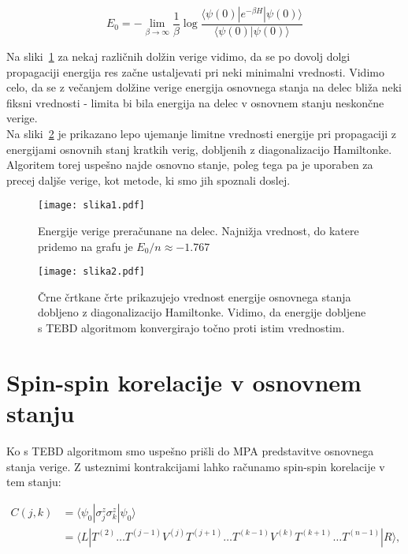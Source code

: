 \documentclass[a4paper]{article}
\newcommand{\bra}[1]{\langle#1|}
\newcommand{\ket}[1]{|#1\rangle}
\newcommand{\s}{\sigma}
\begin{document}
    \begin{equation}\label{eq3}
        E_0 = - \lim_{\beta \to \infty} \frac{1}{\beta} \log{\frac{\bra{\psi(0)}e^{-\beta H}\ket{\psi(0)}}{\langle\psi(0)\ket{\psi(0)}}}
    \end{equation}

    Na sliki~\ref{slika1} za nekaj različnih dolžin verige vidimo, da se po dovolj dolgi propagaciji energija res začne ustaljevati pri neki
    minimalni vrednosti. Vidimo celo, da se z večanjem dolžine verige energija osnovnega stanja na delec bliža neki fiksni vrednosti - limita bi bila
    energija na delec v osnovnem stanju neskončne verige.\\
    Na sliki~\ref{slika2} je prikazano lepo ujemanje limitne vrednosti energije pri propagaciji z energijami osnovnih stanj kratkih verig, dobljenih
    z diagonalizacijo Hamiltonke.
    Algoritem torej uspešno najde osnovno stanje, poleg tega pa je uporaben za precej daljše verige, kot metode, ki smo jih spoznali doslej. 

    \begin{figure}
        \centering
        \texttt{[image: slika1.pdf]}
        \caption{Energije verige preračunane na delec. Najnižja vrednost, do katere pridemo na grafu je $E_0/n \approx -1.767$}
        \label{slika1}
    \end{figure}

    \begin{figure}
        \centering
        \texttt{[image: slika2.pdf]}
        \caption{Črne črtkane črte prikazujejo vrednost energije osnovnega stanja dobljeno z diagonalizacijo Hamiltonke. Vidimo, da 
        energije dobljene s TEBD algoritmom konvergirajo točno proti istim vrednostim.}
        \label{slika2}
    \end{figure}

    \section{Spin-spin korelacije v osnovnem stanju}

    Ko s TEBD algoritmom smo uspešno prišli do MPA predstavitve osnovnega stanja verige. Z usteznimi kontrakcijami lahko računamo spin-spin
    korelacije v tem stanju:

    \begin{equation}\label{eq4}
        \begin{split}
            C(j, k) &= \bra{\psi_0} \s^z_j\s^z_k \ket{\psi_0} \\
            &= \bra{L} T^{(2)} \ldots T^{(j-1)}V^{(j)}T^{(j+1)} \ldots T^{(k-1)}V^{(k)}T^{(k+1)} \ldots T^{(n-1)} \ket{R},
        \end{split}
    \end{equation}
\end{document}
